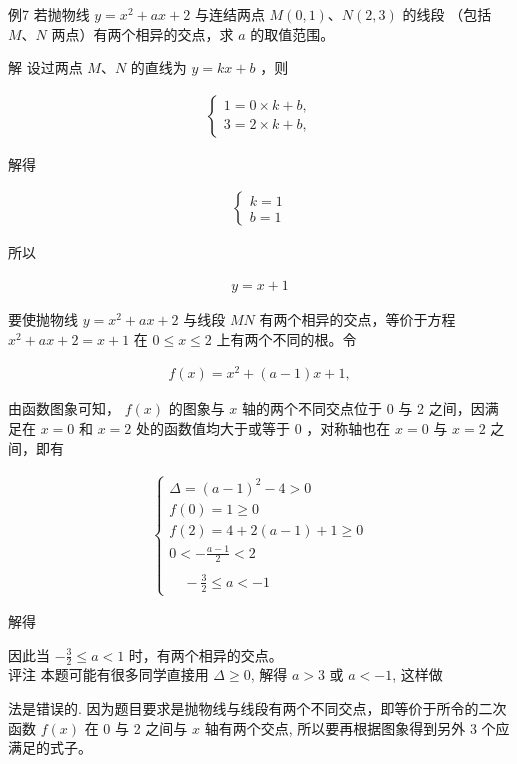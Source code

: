 \documentclass[10pt]{article}
\begin{document}
例7 若抛物线 $y=x^{2}+a x+2$ 与连结两点 $M(0,1) 、 N(2,3)$ 的线段 （包括 $M 、 N$ 两点）有两个相异的交点，求 $a$ 的取值范围。

解 设过两点 $M 、 N$ 的直线为 $y=k x+b$ ，则

\begin{align*}
\left\{\begin{array}{l}
1=0 \times k+b, \\
3=2 \times k+b,
\end{array}\right.
\end{align*}

解得

\begin{align*}
\left\{\begin{array}{l}
k=1 \\
b=1
\end{array}\right.
\end{align*}

所以

\begin{align*}
y=x+1
\end{align*}

要使抛物线 $y=x^{2}+a x+2$ 与线段 $M N$ 有两个相异的交点，等价于方程 $x^{2}+a x+2=x+1$ 在 $0 \leqslant x \leqslant 2$ 上有两个不同的根。令

\begin{align*}
f(x)=x^{2}+(a-1) x+1,
\end{align*}

由函数图象可知， $f(x)$ 的图象与 $x$ 轴的两个不同交点位于 0 与 2 之间，因满足在 $x=0$ 和 $x=2$ 处的函数值均大于或等于 0 ，对称轴也在 $x=0$ 与 $x=2$ 之间，即有

\begin{align*}
\left\{\begin{array}{l}
\Delta=(a-1)^{2}-4>0 \\
f(0)=1 \geqslant 0 \\
f(2)=4+2(a-1)+1 \geqslant 0 \\
0<-\frac{a-1}{2}<2 \\
\\
\quad-\frac{3}{2} \leqslant a<-1
\end{array}\right.
\end{align*}

解得

因此当 $-\frac{3}{2} \leqslant a<1$ 时，有两个相异的交点。\\
评注 本题可能有很多同学直接用 $\Delta \geqslant 0$, 解得 $a>3$ 或 $a<-1$, 这样做

法是错误的. 因为题目要求是抛物线与线段有两个不同交点，即等价于所令的二次函数 $f(x)$ 在 0 与 2 之间与 $x$ 轴有两个交点, 所以要再根据图象得到另外 3 个应满足的式子。
\end{document}

